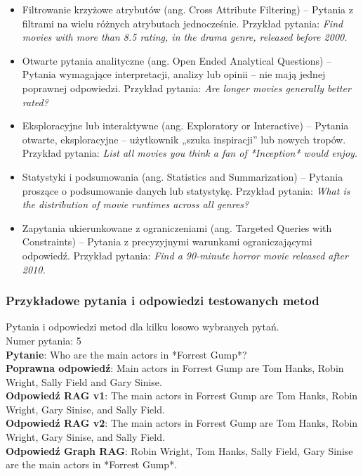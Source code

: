 \documentclass[
a4paper,
12pt,
]{article}
\begin{document}
\begin{itemize}
    \item Filtrowanie krzyżowe atrybutów (ang. Cross Attribute Filtering) -- Pytania z filtrami na wielu różnych atrybutach jednocześnie.
    Przykład pytania: 
    \textit{Find movies with more than 8.5 rating, in the drama genre, released before 2000.}

    \item Otwarte pytania analityczne (ang. Open Ended Analytical Questions) -- Pytania wymagające interpretacji, analizy lub opinii -- nie mają jednej poprawnej odpowiedzi.
    Przykład pytania: 
    \textit{Are longer movies generally better rated?}

    \item Eksploracyjne lub interaktywne (ang. Exploratory or Interactive) -- Pytania otwarte, eksploracyjne -- użytkownik „szuka inspiracji” lub nowych tropów.   
    Przykład pytania: 
    \textit{List all movies you think a fan of *Inception* would enjoy.}

    \item Statystyki i podsumowania (ang. Statistics and Summarization) -- Pytania proszące o podsumowanie danych lub statystykę.
    Przykład pytania: 
    \textit{What is the distribution of movie runtimes across all genres?}

    \item Zapytania ukierunkowane z ograniczeniami (ang. Targeted Queries with Constraints) -- Pytania z precyzyjnymi warunkami ograniczającymi odpowiedź.
    Przykład pytania: 
    \textit{Find a 90-minute horror movie released after 2010.}
\end{itemize}


\subsubsection{Przykładowe pytania i odpowiedzi testowanych metod}
Pytania i odpowiedzi metod dla kilku losowo wybranych pytań.\\

\noindent{}Numer pytania: 5\\
\textbf{Pytanie}: Who are the main actors in *Forrest Gump*?\\
\textbf{Poprawna odpowiedź}: Main actors in Forrest Gump are Tom Hanks, Robin Wright, Sally Field and Gary Sinise.\\
\textbf{Odpowiedź RAG v1}: The main actors in Forrest Gump are Tom Hanks, Robin Wright, Gary Sinise, and Sally Field.\\
\textbf{Odpowiedź RAG v2}: The main actors in Forrest Gump are Tom Hanks, Robin Wright, Gary Sinise, and Sally Field.\\
\textbf{Odpowiedź Graph RAG}: Robin Wright, Tom Hanks, Sally Field, Gary Sinise are the main actors in *Forrest Gump*.\\
\end{document}
